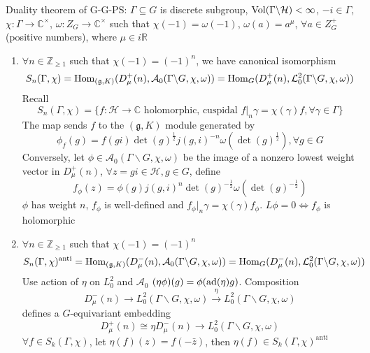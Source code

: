 \documentclass[main]{subfiles}
\begin{document}
Duality theorem of G-G-PS: $\Gamma\subseteq G$ is discrete subgroup, $\operatorname{Vol}(\Gamma\backslash\mathcal H)<\infty$, $-i\in\Gamma$, $\chi:\Gamma\to\mathbb C^\times$, $\omega:Z_G\to\mathbb C^\times$ such that $\chi(-1)=\omega(-1)$, $\omega(a)=a^\mu$, $\forall a\in Z_G^+$ (positive numbers), where $\mu\in i \mathbb R$
\begin{enumerate}[leftmargin=*]
\item $\forall n\in\mathbb Z_{\geq1}$ such that $\chi(-1)=(-1)^n$, we have canonical isomorphism \[S_n(\Gamma,\chi)=\operatorname{Hom}_{(\mathfrak g,K)}(D^+_\mu(n),\mathcal A_0(\Gamma\backslash G,\chi,\omega))=\operatorname{Hom}_{G}(D^+_\mu(n),\mathcal L^2_0(\Gamma\backslash G,\chi,\omega))\] Recall
\[S_n(\Gamma,\chi)=\{f:\mathcal H\to\mathbb C\text{ holomorphic, cuspidal }f|_n\gamma=\chi(\gamma)f,\forall \gamma\in\Gamma\}\]
The map sends $f$ to the $(\mathfrak g,K)$ module generated by 
\[\phi_f(g)=f(gi)\det(g)^{\frac{1}{2}}j(g,i)^{-n}\omega(\det(g)^{\frac{1}{2}}),\forall g\in G\]
Conversely, let $\phi\in\mathcal A_0(\Gamma\backslash G,\chi,\omega)$ be the image of a nonzero lowest weight vector in $D^+_\mu(n)$, $\forall z=gi\in\mathcal H,g\in G$, define \[f_\phi(z)=\phi(g)j(g,i)^n\det(g)^{-\frac{1}{2}}\omega(\det(g)^{-\frac{1}{2}})\] $\phi$ has weight $n$, $f_\phi$ is well-defined and $f_\phi|_n\gamma=\chi(\gamma)f_\phi$. $L\phi=0\iff f_\phi$ is holomorphic
\item $\forall n\in\mathbb Z_{\geq1}$ such that $\chi(-1)=(-1)^n$
\[S_n(\Gamma,\chi)^{\mathrm{anti}}=\operatorname{Hom}_{(\mathfrak g,K)}(D^-_\mu(n),\mathcal A_0(\Gamma\backslash G,\chi,\omega))=\operatorname{Hom}_{G}(D^-_\mu(n),\mathcal L^2_0(\Gamma\backslash G,\chi,\omega))\]
Use action of $\eta$ on $L_0^2$ and $\mathcal A_0$ $(\eta\phi)(g)=\phi(\operatorname{ad}(\eta)g)$. Composition
\[D^-_\mu(n)\to L_0^2(\Gamma\backslash G,\chi,\omega)\xrightarrow{\eta}L_0^2(\Gamma\backslash G,\chi,\omega)\]
defines a $G$-equivariant embedding
\[D^+_\mu(n)\cong \eta D^-_\mu(n)\to L_0^2(\Gamma\backslash G,\chi,\omega)\]
$\forall f\in S_k(\Gamma,\chi)$, let $\eta(f)(z)=f(-\bar z)$, then $\eta(f)\in S_k(\Gamma,\chi)^\mathrm{anti}$
\begin{center}
\end{center}
\end{enumerate}
\end{document}
